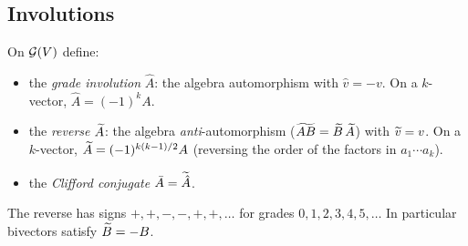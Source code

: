 \subsection{Involutions}

\begin{definition}
On $\mathcal{G}(V)$ define:
\begin{itemize}
  \item the \emph{grade involution} $\hat A$: the algebra automorphism with $\hat v=-v$. On a $k$-vector, $\hat A=(-1)^kA$.
  \item the \emph{reverse} $\widetilde{A}$: the algebra \emph{anti}-automorphism ($\widetilde{AB}=\widetilde{B}\,\widetilde{A}$) with $\widetilde{v}=v$. On a $k$-vector, $\widetilde{A}=(-1)^{k(k-1)/2}A$ (reversing the order of the factors in $a_1\cdots a_k$).
  \item the \emph{Clifford conjugate} $\bar A=\widetilde{\hat A}$.
\end{itemize}
\end{definition}

The reverse has signs $+,+,-,-,+,+,\dots$ for grades $0,1,2,3,4,5,\dots$ In particular bivectors satisfy $\widetilde{B}=-B$.
